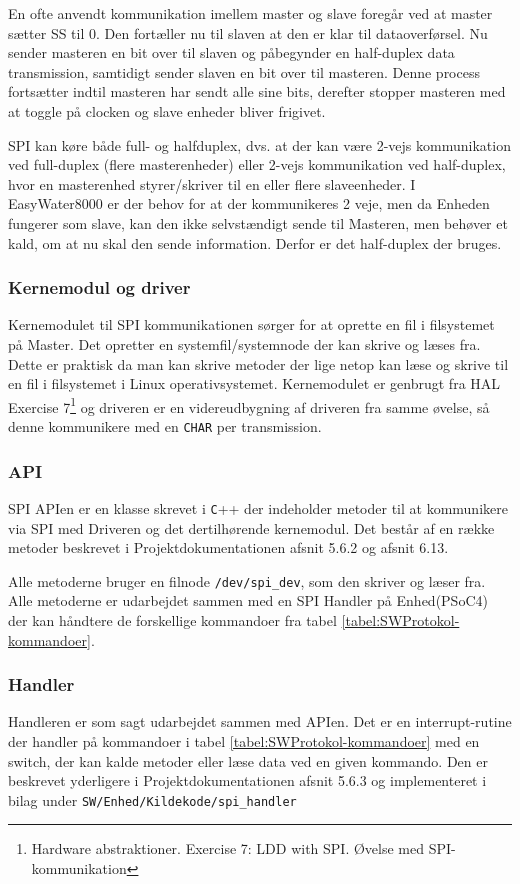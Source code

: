 En ofte anvendt kommunikation imellem master og slave foregår ved at master sætter SS til 0. Den fortæller nu til slaven at den er klar til 
dataoverførsel. Nu sender masteren en bit over til slaven og påbegynder en half-duplex data transmission, samtidigt sender slaven en bit over til masteren. Denne process fortsætter indtil masteren har sendt alle sine bits, derefter stopper masteren med at toggle på clocken og slave enheder bliver frigivet.

SPI kan køre både full- og halfduplex, dvs. at der kan være 2-vejs kommunikation ved full-duplex (flere masterenheder) eller 2-vejs kommunikation ved half-duplex, hvor en masterenhed styrer/skriver til en eller flere slaveenheder. I EasyWater8000 er der behov for at der kommunikeres 2 veje, men da Enheden fungerer som slave, kan den ikke selvstændigt sende til Masteren, men behøver et kald, om at nu skal den sende information. Derfor er det half-duplex der bruges.

\subsubsection*{Kernemodul og driver}

Kernemodulet til SPI kommunikationen sørger for at oprette en fil i filsystemet på Master. Det opretter en systemfil/systemnode der kan skrive og læses fra. Dette er praktisk da man kan skrive metoder der lige netop kan læse og skrive til en fil i filsystemet i Linux operativsystemet. Kernemodulet er genbrugt fra HAL Exercise 7\footnote{Hardware abstraktioner. Exercise 7: LDD with SPI. Øvelse med SPI-kommunikation} og driveren er en videreudbygning af driveren fra samme øvelse, så denne kommunikere med en \verb+CHAR+ per transmission.

\subsubsection*{API}

SPI APIen er en klasse skrevet i \verb+C+++ der indeholder metoder til at kommunikere via SPI med Driveren og det dertilhørende kernemodul. Det består af en række metoder beskrevet i Projektdokumentationen afsnit 5.6.2 og afsnit 6.13. 

Alle metoderne bruger en filnode \verb+/dev/spi_dev+, som den skriver og læser fra. Alle metoderne er udarbejdet sammen med en SPI Handler på Enhed(PSoC4) der kan håndtere de forskellige kommandoer fra tabel \ref{tabel:SWProtokol-kommandoer}.

\subsubsection*{Handler}

Handleren er som sagt udarbejdet sammen med APIen. Det er en interrupt-rutine der handler på kommandoer i tabel \ref{tabel:SWProtokol-kommandoer} med en switch, der kan kalde metoder eller læse data ved en given kommando. Den er beskrevet yderligere i Projektdokumentationen afsnit 5.6.3 og implementeret i bilag under \verb+SW/Enhed/Kildekode/spi_handler+